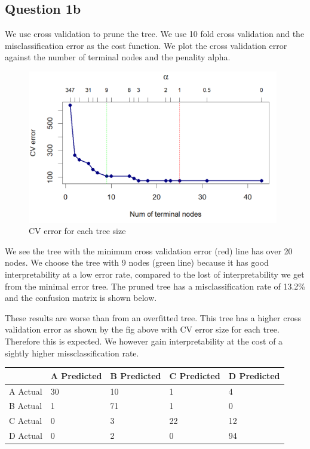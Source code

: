 \documentclass[
]{article}
\begin{document}
\hypertarget{question-1b}{%
\subsection{Question 1b}\label{question-1b}}

We use cross validation to prune the tree. We use 10 fold cross
validation and the misclassification error as the cost function. We plot
the cross validation error against the number of terminal nodes and the
penality alpha.

\begin{figure}
\centering
\includegraphics[width=4.32292in,height=\textheight]{cv_error_num_nones_mealies.png}
\caption{CV error for each tree size}
\end{figure}

We see the tree with the minimum cross validation error (red) line has
over 20 nodes. We choose the tree with 9 nodes (green line) because it
has good interpretability at a low error rate, compared to the lost of
interpretability we get from the minimal error tree. The pruned tree has
a misclassification rate of 13.2\% and the confusion matrix is shown
below.

These results are worse than from an overfitted tree. This tree has a
higher cross validation error as shown by the fig above with CV error
size for each tree. Therefore this is expected. We however gain
interpretability at the cost of a sightly higher missclassification
rate.

\begin{longtable}[]{@{}lllll@{}}
\toprule\noalign{}
& A Predicted & B Predicted & C Predicted & D Predicted \\
\midrule\noalign{}
\endhead
\bottomrule\noalign{}
\endlastfoot
A Actual & 30 & 10 & 1 & 4 \\
B Actual & 1 & 71 & 1 & 0 \\
C Actual & 0 & 3 & 22 & 12 \\
D Actual & 0 & 2 & 0 & 94 \\
\end{longtable}
\end{document}

